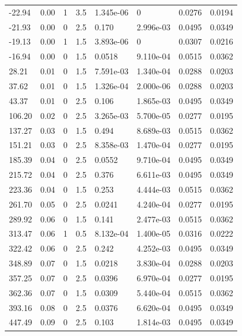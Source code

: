 \documentclass[preview]{standalone}
\begin{document}
{{\begin{tabular}{L{1.2cm}C{1.2cm} C{0.3cm}C{0.5cm} C{1.4cm}C{1.4cm} C{1.4cm}C{1.4cm}}
  -22.94  &  0.00  & 1     & 3.5 &  1.345e-06  & 0  & 0.0276 &  0.0194   \\ 
  -21.93  &  0.00  & 0     & 2.5 &  0.170  & 2.996e-03  & 0.0495 &  0.0349   \\ 
  -19.13  &  0.00  & 1     & 1.5 &  3.893e-06  & 0  & 0.0307 &  0.0216   \\ 
  -16.94  &  0.00  & 0     & 1.5 &  0.0518  & 9.110e-04  & 0.0515 &  0.0362   \\ 
  28.21  &  0.01  & 0     & 1.5 &  7.591e-03  & 1.340e-04  & 0.0288 &  0.0203   \\ 
  37.62  &  0.01  & 0     & 1.5 &  1.326e-04  & 2.000e-06  & 0.0288 &  0.0203   \\ 
  43.37  &  0.01  & 0     & 2.5 &  0.106  & 1.865e-03  & 0.0495 &  0.0349   \\ 
  106.20  &  0.02  & 0     & 2.5 &  3.265e-03  & 5.700e-05  & 0.0277 &  0.0195   \\ 
  137.27  &  0.03  & 0     & 1.5 &  0.494  & 8.689e-03  & 0.0515 &  0.0362   \\ 
  151.21  &  0.03  & 0     & 2.5 &  8.358e-03  & 1.470e-04  & 0.0277 &  0.0195   \\ 
  185.39  &  0.04  & 0     & 2.5 &  0.0552  & 9.710e-04  & 0.0495 &  0.0349   \\ 
  215.72  &  0.04  & 0     & 2.5 &  0.376  & 6.611e-03  & 0.0495 &  0.0349   \\ 
  223.36  &  0.04  & 0     & 1.5 &  0.253  & 4.444e-03  & 0.0515 &  0.0362   \\ 
  261.70  &  0.05  & 0     & 2.5 &  0.0241  & 4.240e-04  & 0.0277 &  0.0195   \\ 
  289.92  &  0.06  & 0     & 1.5 &  0.141  & 2.477e-03  & 0.0515 &  0.0362   \\ 
  313.47  &  0.06  & 1     & 0.5 &  8.132e-04  & 1.400e-05  & 0.0316 &  0.0222   \\ 
  322.42  &  0.06  & 0     & 2.5 &  0.242  & 4.252e-03  & 0.0495 &  0.0349   \\ 
  348.89  &  0.07  & 0     & 1.5 &  0.0218  & 3.830e-04  & 0.0288 &  0.0203   \\ 
  357.25  &  0.07  & 0     & 2.5 &  0.0396  & 6.970e-04  & 0.0277 &  0.0195   \\ 
  362.36  &  0.07  & 0     & 1.5 &  0.0309  & 5.440e-04  & 0.0515 &  0.0362   \\ 
  393.16  &  0.08  & 0     & 2.5 &  0.0376  & 6.620e-04  & 0.0495 &  0.0349   \\ 
  447.49  &  0.09  & 0     & 2.5 &  0.103  & 1.814e-03  & 0.0495 &  0.0349   \\ 

\end{tabular}}}
\end{document}

